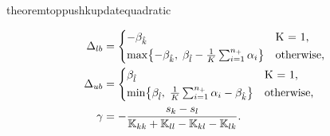 \begin{restatable}{theorem}{toppushkupdatequadratic}
\begin{itemize}
    \begin{align*}
      \Delta_{lb} & = 
        \begin{cases*}
          -\beta_{\hat k} & K = 1, \\
          \max \Brac[c]{- \beta_{\hat k},\; \beta_{\hat l} - \frac{1}{K} \sum_{i = 1}^{\npos} \alpha_i} & \textrm{otherwise},
        \end{cases*} \\
      \Delta_{ub} & = 
        \begin{cases*}
          \beta_{\hat l} & K = 1, \\
          \min \Brac[c]{\beta_{\hat l},\; \frac{1}{K} \sum_{i = 1}^{\npos} \alpha_i - \beta_{\hat k}} & \textrm{otherwise},
        \end{cases*} \\
      \gamma & = -\frac{s_k - s_l}{\K_{kk} + \K_{ll} - \K_{kl} - \K_{lk}}.
    \end{align*}
  \end{itemize}
\end{restatable}
